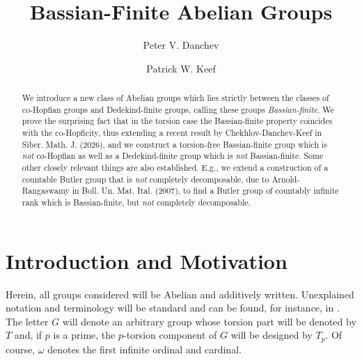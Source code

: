 \documentclass[12pt]{amsart}
\theoremstyle{definition}
\begin{document}
\author[P.V. Danchev]{Peter V. Danchev}
\address{Institute of Mathematics and Informatics, Bulgarian Academy of Sciences \\ "Acad. G. Bonchev" str., bl. 8, 1113 Sofia, Bulgaria.}
\author[P.W. Keef]{Patrick W. Keef}
\address{Department of Mathematics, Whitman College, 345 Boyer Avenue, Walla Walla, WA, 99362, United States of America.}

\title[Bassian-Finite Abelian Groups]{Bassian-Finite Abelian Groups}

\maketitle

\begin{abstract} We introduce a new class of Abelian groups which lies strictly between the classes of co-Hopfian groups and Dedekind-finite groups, calling these groups {\it Bassian-finite}. We prove the surprising fact that in the torsion case the Bassian-finite property coincides with the co-Hopficity, thus extending a recent result by Chekhlov-Danchev-Keef in Siber. Math. J. (2026), and we construct a torsion-free Bassian-finite group which is {\it not} co-Hopfian as well as a Dedekind-finite group which is {\it not} Bassian-finite. Some other closely relevant things are also established. E.g., we extend a construction of a countable Butler group that is {\it not} completely decomposable, due to Arnold-Rangaswamy in Boll. Un. Mat. Ital. (2007), to find a Butler group of countably infinite rank which is Bassian-finite, but {\it not} completely decomposable.
\end{abstract}

\section{Introduction and Motivation}\label{one}

Herein, all groups considered will be Abelian and additively written. Unexplained notation and terminology will be standard and can be found, for instance, in \cite{F}. The letter $G$ will denote an arbitrary group whose torsion part will be denoted by $T$ and, if $p$ is a prime, the $p$-torsion component of $G$ will be designed by $T_p$. Of course, $\omega$ denotes the first infinite ordinal and cardinal.
\end{document}
